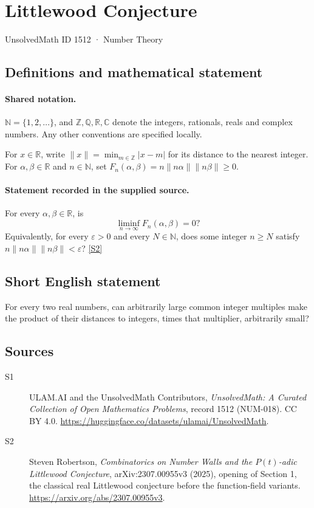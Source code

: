 \documentclass[11pt]{article}
\newcommand{\sref}[2]{\hyperlink{source:#1:#2}{[S#2]}}
\begin{document}
\setcounter{section}{1511}
\section{Littlewood Conjecture}\label{1512}
{\small\sffamily UnsolvedMath ID 1512 · Number Theory}
\subsection{Definitions and mathematical statement}

\paragraph{Shared notation.}$\mathbb N=\{1,2,\ldots\}$, and $\mathbb Z,\mathbb Q,\mathbb R,\mathbb C$ denote the integers, rationals, reals and complex numbers. Any other conventions are specified locally.


For \(x\in\mathbb R\), write
\(\|x\|=\min_{m\in\mathbb Z}|x-m|\) for its distance to
the nearest integer. For \(\alpha,\beta\in\mathbb R\) and
\(n\in\mathbb N\), set
\(F_n(\alpha,\beta)=n\|n\alpha\|\|n\beta\|\ge0\).
\paragraph{Statement recorded in the supplied source.}
For every \(\alpha,\beta\in\mathbb R\), is
\[
                      \liminf_{n\to\infty}F_n(\alpha,\beta)=0?
\]
Equivalently, for every \(\varepsilon>0\) and every \(N\in\mathbb N\),
does some integer \(n\ge N\) satisfy
\(n\|n\alpha\|\|n\beta\|<\varepsilon\)? \sref{1512}{2}
\subsection{Short English statement}
For every two real numbers, can arbitrarily large common integer multiples make the product of their distances to integers, times that multiplier, arbitrarily small?
\subsection{Sources}
\begin{description}
\item[\hypertarget{source:1512:1}{S1}] ULAM.AI and the UnsolvedMath Contributors, \emph{UnsolvedMath: A Curated Collection of Open Mathematics Problems}, record 1512 (NUM-018). CC BY 4.0. \url{https://huggingface.co/datasets/ulamai/UnsolvedMath}.
\item[\hypertarget{source:1512:2}{S2}] Steven Robertson, \emph{Combinatorics on Number Walls and the $P(t)$-adic Littlewood Conjecture}, arXiv:2307.00955v3 (2025), opening of Section 1, the classical real Littlewood conjecture before the function-field variants. \url{https://arxiv.org/abs/2307.00955v3}.
\end{description}
\label{end:1512}
\end{document}
